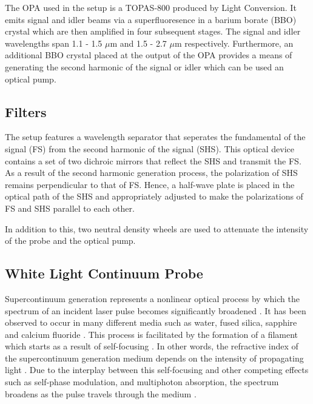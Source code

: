 The OPA used in the setup is a TOPAS-800 produced by Light Conversion. It emits signal and idler beams via a superfluoresence in a barium borate (BBO) crystal which are then amplified in four subsequent stages. The signal and idler wavelengths span 1.1 - 1.5 $\mu$m  and 1.5 - 2.7 $\mu$m respectively. Furthermore, an additional BBO crystal placed at the output of the OPA provides a means of generating the second harmonic of the signal or idler which can be used an optical pump.

\subsection{Filters}

The setup features a wavelength separator that seperates the fundamental of the signal (FS) from the second harmonic of the signal (SHS). This optical device contains a set of two dichroic mirrors that reflect the SHS and transmit the FS. As a result of the second harmonic generation process, the polarization of SHS remains perpendicular to that of FS. Hence, a half-wave plate is placed in the optical path of the SHS and appropriately adjusted to make the polarizations of FS and SHS parallel to each other. 

In addition to this, two neutral density wheels are used to attenuate the intensity of the probe and the optical pump.

\subsection{White Light Continuum Probe}


\label{section:white_light_probe}
Supercontinuum generation represents a nonlinear optical process by which the spectrum of an incident laser pulse becomes significantly broadened \cite{dubietis2017ultrafast}. It has been observed to occur in many different media such as water, fused silica, sapphire and calcium fluoride \cite{dubietis2017ultrafast}. This process is facilitated by the formation of a filament which starts as a result of self-focusing \cite{dubietis2017ultrafast}. In other words, the refractive index of the supercontinuum generation medium depends on the intensity of propagating light \cite{dubietis2017ultrafast}. Due to the interplay between this self-focusing and other competing effects such as self-phase modulation, and multiphoton absorption, the spectrum  broadens as the pulse travels through the medium \cite{dubietis2017ultrafast}. 

